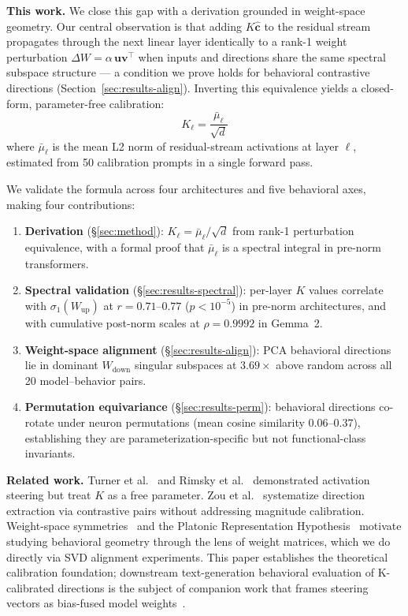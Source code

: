 \documentclass{article}
\newcommand{\uu}{\mathbf{u}}
\newcommand{\vv}{\mathbf{v}}
\newcommand{\ch}{\hat{\mathbf{c}}}
\newcommand{\mubar}{\bar{\mu}}
\newcommand{\sone}{\sigma_1}
\newcommand{\Wup}{W_{\!\mathrm{up}}}
\newcommand{\Wdn}{W_{\!\mathrm{down}}}
\begin{document}
\textbf{This work.}
We close this gap with a derivation grounded in weight-space geometry.
Our central observation is that adding $K\ch$ to the residual stream propagates
through the next linear layer identically to a rank-1 weight perturbation
$\Delta W = \alpha\,\uu\vv^\top$ when inputs and directions share the same spectral
subspace structure — a condition we prove holds for behavioral contrastive directions
(Section~\ref{sec:results-align}).
Inverting this equivalence yields a closed-form, parameter-free calibration:
\[
  \boxed{K_\ell = \frac{\mubar_\ell}{\sqrt{d}}}
\]
where $\mubar_\ell$ is the mean L2 norm of residual-stream activations at layer $\ell$,
estimated from 50 calibration prompts in a single forward pass.

We validate the formula across four architectures and five behavioral axes, making
four contributions:
\begin{enumerate}[leftmargin=1.4em,itemsep=0pt,topsep=2pt]
  \item \textbf{Derivation} (\S\ref{sec:method}): $K_\ell = \mubar_\ell/\!\sqrt{d}$ from
        rank-1 perturbation equivalence, with a formal proof that $\mubar_\ell$ is a
        spectral integral in pre-norm transformers.
  \item \textbf{Spectral validation} (\S\ref{sec:results-spectral}):
        per-layer $K$ values correlate with $\sone(\Wup)$ at $r{=}0.71$--$0.77$
        ($p{<}10^{-5}$) in pre-norm architectures, and with cumulative post-norm scales
        at $\rho{=}0.9992$ in Gemma~2.
  \item \textbf{Weight-space alignment} (\S\ref{sec:results-align}):
        PCA behavioral directions lie in dominant $\Wdn$ singular subspaces at
        $3.69\times$ above random across all 20 model--behavior pairs.
  \item \textbf{Permutation equivariance} (\S\ref{sec:results-perm}):
        behavioral directions co-rotate under neuron permutations (mean cosine
        similarity $0.06$--$0.37$), establishing they are parameterization-specific
        but not functional-class invariants.
\end{enumerate}

\textbf{Related work.}
Turner et al.~\citep{turner2023activation} and Rimsky et
al.~\citep{rimsky2024contrastive} demonstrated activation steering but treat $K$
as a free parameter.
Zou et al.~\citep{zou2023representation} systematize direction extraction via
contrastive pairs without addressing magnitude calibration.
Weight-space symmetries~\citep{ainsworth2023git} and the Platonic Representation
Hypothesis~\citep{huh2024platonic} motivate studying behavioral geometry through
the lens of weight matrices, which we do directly via SVD alignment experiments.
This paper establishes the theoretical calibration foundation; downstream
text-generation behavioral evaluation of K-calibrated directions is the subject of
companion work that frames steering vectors as bias-fused model weights~\citep{avaw2026}.
\end{document}
